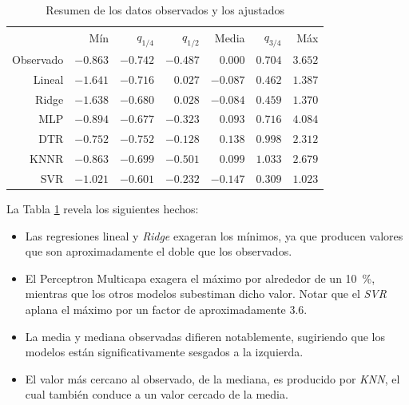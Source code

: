   \begin{table}[hbt]
  \centering
  \caption{Resumen de los datos observados y los ajustados}\label{Tab:Summary}
  \begin{tabular}{*7{r}}
  \toprule
  &Mín	&$q_{1/4}$	&$q_{1/2}$	&Media	&$q_{3/4}$	&Máx\\ \cmidrule(lr){2-7}
  Observado	&$-0.863$	&$-0.742$	&$-0.487$	&$0.000$	&$0.704$	&$3.652$\\
  Lineal	&$-1.641$	&$-0.716$	&$ 0.027$	&$-0.087$	&$0.462$	&$1.387$\\
  Ridge	&$-1.638$	&$-0.680$	&$ 0.028$	&$-0.084$	&$0.459$	&$1.370$\\
  MLP	&$-0.894$	&$-0.677$	&$-0.323$	&$0.093$	&$0.716$	&$4.084$\\
  DTR	&$-0.752$	&$-0.752$	&$-0.128$	&$0.138$	&$0.998$	&$2.312$\\
  KNNR	&$-0.863$	&$-0.699$	&$-0.501$	&$0.099$	&$1.033$	&$2.679$\\
  SVR	&$-1.021$	&$-0.601$	&$-0.232$	&$-0.147$	&$0.309$	&$1.023$\\
  \bottomrule
  \end{tabular}
  \end{table}

  \par La Tabla \ref{Tab:Summary} revela los siguientes hechos:

    \begin{itemize}
      \item Las regresiones lineal y \textit{Ridge} exageran los mínimos, ya
        que producen valores que son aproximadamente el doble que los observados.
      \item El Perceptron Multicapa exagera el máximo por alrededor de un \SI{10}{\percent},
        mientras que los otros modelos subestiman dicho valor. Notar que el \textit{SVR}
        aplana el máximo por un factor de aproximadamente 3.6.
      \item La media y mediana observadas difieren notablemente, sugiriendo que
        los modelos están significativamente sesgados a la izquierda.
      \item El valor más cercano al observado, de la mediana, es producido por
        \textit{KNN}, el cual también conduce a un valor cercado de la media.

    \end{itemize}


